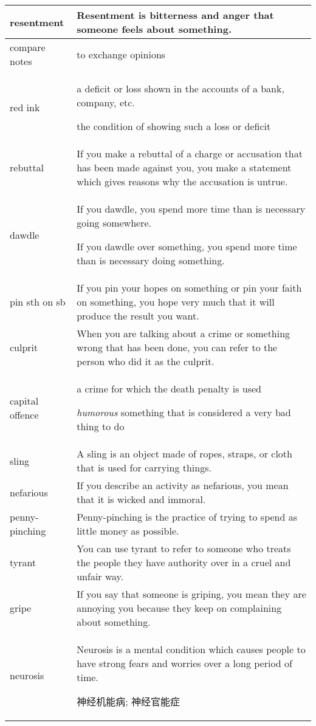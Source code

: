 \documentclass{article}
\begin{document}
\begin{center}
\begin{longtable}{|l|p{9cm}|}
\hline
resentment
&
Resentment is bitterness and anger that someone feels about something.
\\

\hline
compare notes
&
to exchange opinions
\\

\hline
red ink
&
a deficit or loss shown in the accounts of a bank, company, etc.
\par
the condition of showing such a loss or deficit
\\

\hline
rebuttal
&
If you make a rebuttal of a charge or accusation that has been made against you, you make a statement which gives reasons why the accusation is untrue.
\\

\hline
dawdle
&
If you dawdle, you spend more time than is necessary going somewhere.
\par
If you dawdle over something, you spend more time than is necessary doing something.
\\

\hline
pin sth on sb
&
If you pin your hopes on something or pin your faith on something, you hope very much that it will produce the result you want.
\\

\hline
culprit
&
When you are talking about a crime or something wrong that has been done, you can refer to the person who did it as the culprit.
\\

\hline
capital offence
&
a crime for which the death penalty is used
\par
\textit{humorous} something that is considered a very bad thing to do
\\

\hline
sling
&
A sling is an object made of ropes, straps, or cloth that is used for carrying things.
\\

\hline
nefarious
&
If you describe an activity as nefarious, you mean that it is wicked and immoral.
\\

\hline
penny-pinching
&
Penny-pinching is the practice of trying to spend as little money as possible.
\\

\hline
tyrant
&
You can use tyrant to refer to someone who treats the people they have authority over in a cruel and unfair way.
\\

\hline
gripe
&
If you say that someone is griping, you mean they are annoying you because they keep on complaining about something.
\\

\hline
neurosis
&
Neurosis is a mental condition which causes people to have strong fears and worries over a long period of time.
\par
神经机能病; 神经官能症
\\

\hline

\end{longtable}
\end{center}
\end{document}
